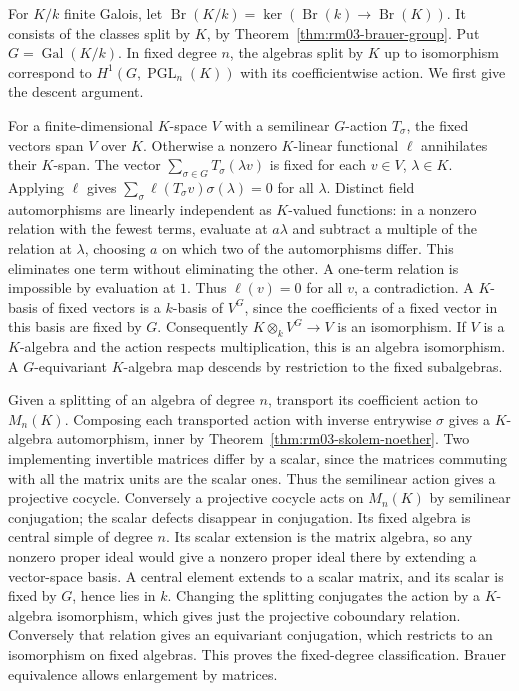 \begin{remark}
\label{rem:rm03-relative-brauer}
For \(K/k\) finite Galois, let
\(\operatorname{Br}(K/k)=\ker(\operatorname{Br}(k)\to\operatorname{Br}(K))\).
It consists of the classes split by \(K\), by
Theorem~\ref{thm:rm03-brauer-group}. Put \(G=\operatorname{Gal}(K/k)\).
In fixed degree \(n\), the algebras split by \(K\) up to
isomorphism correspond to \(H^1(G,\operatorname{PGL}_n(K))\)
with its coefficientwise action. We first give the descent argument.

For a finite-dimensional \(K\)-space \(V\) with a semilinear
\(G\)-action \(T_\sigma\), the fixed vectors span \(V\) over \(K\).
Otherwise a nonzero \(K\)-linear functional \(\ell\) annihilates
their \(K\)-span. The vector
\(\sum_{\sigma\in G} T_\sigma(\lambda v)\) is fixed for each
\(v\in V\), \(\lambda\in K\). Applying \(\ell\) gives
\(\sum_\sigma\ell(T_\sigma v)\sigma(\lambda)=0\) for all \(\lambda\).
Distinct field automorphisms are linearly independent as
\(K\)-valued functions: in a nonzero relation with the fewest
terms, evaluate at \(a\lambda\) and subtract a multiple of the
relation at \(\lambda\), choosing \(a\) on which two of the
automorphisms differ. This eliminates one term without
eliminating the other. A one-term relation is impossible by
evaluation at \(1\). Thus \(\ell(v)=0\) for all \(v\), a
contradiction. A \(K\)-basis of fixed vectors is a \(k\)-basis of
\(V^G\), since the coefficients of a fixed vector in this basis
are fixed by \(G\). Consequently \(K\otimes_k V^G\to V\) is an
isomorphism. If \(V\) is a \(K\)-algebra and the action respects
multiplication, this is an algebra isomorphism. A \(G\)-equivariant
\(K\)-algebra map descends by restriction to the fixed subalgebras.

Given a splitting of an algebra of degree \(n\), transport its
coefficient action to \(M_n(K)\). Composing each transported
action with inverse entrywise \(\sigma\) gives a \(K\)-algebra
automorphism, inner by Theorem~\ref{thm:rm03-skolem-noether}.
Two implementing invertible matrices differ by a scalar, since
the matrices commuting with all the matrix units are the scalar
ones. Thus the semilinear action gives a projective cocycle.
Conversely a projective cocycle acts on \(M_n(K)\) by semilinear
conjugation; the scalar defects disappear in conjugation. Its
fixed algebra is central simple of degree \(n\). Its scalar
extension is the matrix algebra, so any nonzero proper ideal
would give a nonzero proper ideal there by extending a vector-space
basis. A central element extends to a scalar matrix, and its
scalar is fixed by \(G\), hence lies in \(k\). Changing the
splitting conjugates the action by a \(K\)-algebra isomorphism,
which gives just the projective coboundary relation.
Conversely that relation gives an equivariant conjugation, which
restricts to an isomorphism on fixed algebras. This proves the
fixed-degree classification. Brauer equivalence allows
enlargement by matrices.


\end{remark}
